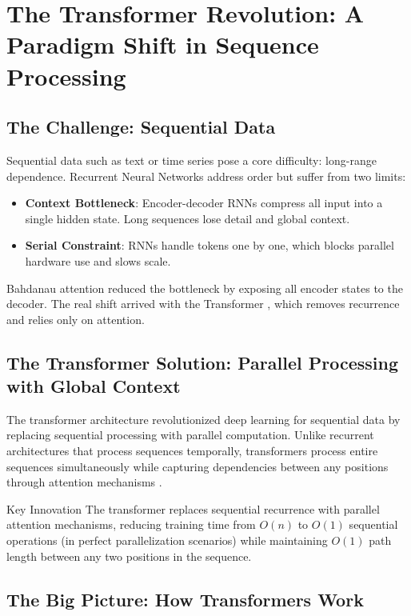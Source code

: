 \section{The Transformer Revolution: A Paradigm Shift in Sequence Processing}
\subsection{The Challenge: Sequential Data}

Sequential data such as text or time series pose a core difficulty: long-range dependence. Recurrent Neural Networks address order but suffer from two limits:

\begin{itemize}
  \item \textbf{Context Bottleneck}: Encoder-decoder RNNs compress all input into a single hidden state. Long sequences lose detail and global context.
  \item \textbf{Serial Constraint}: RNNs handle tokens one by one, which blocks parallel hardware use and slows scale.
\end{itemize}

Bahdanau attention reduced the bottleneck by exposing all encoder states to the decoder. The real shift arrived with the Transformer \cite{vaswani2017attention}, which removes recurrence and relies only on attention.


\subsection{The Transformer Solution: Parallel Processing with Global Context}

The transformer architecture revolutionized deep learning for sequential data by replacing sequential processing with parallel computation. Unlike recurrent architectures that process sequences temporally, transformers process entire sequences simultaneously while capturing dependencies between any positions through attention mechanisms \cite{Bahdanau2014}.

\begin{calloutbox}{Key Innovation}
  The transformer replaces sequential recurrence with parallel attention mechanisms, reducing training time from $O(n)$ to $O(1)$ sequential operations (in perfect parallelization scenarios) while maintaining $O(1)$ path length between any two positions in the sequence.
\end{calloutbox}

\subsection{The Big Picture: How Transformers Work}

